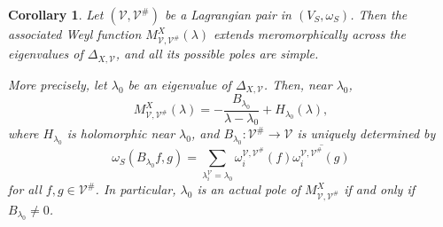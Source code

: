 \documentclass[12pt]{amsart}
\theoremstyle{plain}
\newtheorem{cor}[thm]{Corollary}
\theoremstyle{definition}
\theoremstyle{remark}
\numberwithin{equation}{section} \numberwithin{figure}{section}
\renewcommand*{\to}{\rightarrow}
\begin{document}
\begin{cor}\label{cor:weyl-function-simple-poles}
Let \((\mathcal V,\mathcal V^\#)\) be a Lagrangian pair in
\((V_S,\omega_S)\). Then the associated Weyl function
\(M_{\mathcal V,\mathcal V^\#}^{X}(\lambda)\) extends
meromorphically across the eigenvalues of
\(\Delta_{X,\mathcal V}\), and all its possible poles are simple.

More precisely, let \(\lambda_0\) be an eigenvalue of
\(\Delta_{X,\mathcal V}\). Then, near \(\lambda_0\),
\[
M_{\mathcal V,\mathcal V^\#}^{X}(\lambda)
=
-\frac{B_{\lambda_0}}{\lambda-\lambda_0}
+
H_{\lambda_0}(\lambda),
\]
where \(H_{\lambda_0}\) is holomorphic near \(\lambda_0\), and
\(B_{\lambda_0}:\mathcal V^\#\to\mathcal V\) is uniquely determined
by
\[
\omega_S(B_{\lambda_0}f,g)
=
\sum_{\lambda_i^{\mathcal V}=\lambda_0}
\omega_i^{\mathcal V,\mathcal V^\#}(f)
\overline{\omega_i^{\mathcal V,\mathcal V^\#}(g)}
\]
for all \(f,g\in\mathcal V^\#\). In particular, \(\lambda_0\) is an
actual pole of \(M_{\mathcal V,\mathcal V^\#}^{X}\) if and only if
\(B_{\lambda_0}\neq0\).
\end{cor}
\end{document}
